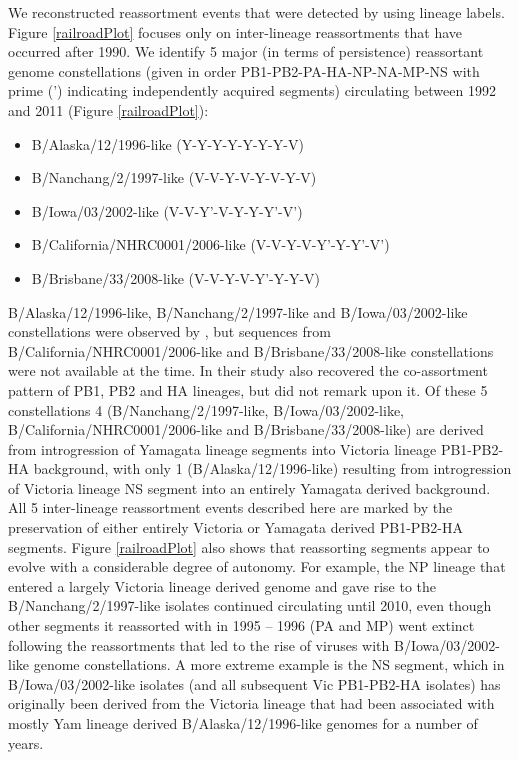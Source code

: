 \documentclass[11pt,oneside,letterpaper]{article}
\begin{document}
We reconstructed reassortment events that were detected by using lineage labels.
Figure \ref{railroadPlot} focuses only on inter-lineage reassortments that have occurred after 1990.
We identify 5 major (in terms of persistence) reassortant genome constellations (given in order PB1-PB2-PA-HA-NP-NA-MP-NS with prime (') indicating independently acquired segments) circulating between 1992 and 2011 (Figure \ref{railroadPlot}):
\begin{itemize}
  \item B/Alaska/12/1996-like (Y-Y-Y-Y-Y-Y-Y-V)
  \item B/Nanchang/2/1997-like (V-V-Y-V-Y-V-Y-V)
  \item B/Iowa/03/2002-like (V-V-Y'-V-Y-Y-Y'-V')
  \item B/California/NHRC0001/2006-like (V-V-Y-V-Y'-Y-Y'-V')
  \item B/Brisbane/33/2008-like (V-V-Y-V-Y'-Y-Y-V)
\end{itemize}
B/Alaska/12/1996-like, B/Nanchang/2/1997-like and B/Iowa/03/2002-like constellations were observed by \citet{chen2008}, but sequences from \\B/California/NHRC0001/2006-like and B/Brisbane/33/2008-like constellations were not available at the time.
In their study \citet{chen2008} also recovered the co-assortment pattern of PB1, PB2 and HA lineages, but did not remark upon it.
Of these 5 constellations 4 (B/Nanchang/2/1997-like, B/Iowa/03/2002-like,\\ B/California/NHRC0001/2006-like and B/Brisbane/33/2008-like) are derived from introgression of Yamagata lineage segments into Victoria lineage PB1-PB2-HA background, with only 1 (B/Alaska/12/1996-like) resulting from introgression of Victoria lineage NS segment into an entirely Yamagata derived background.
All 5 inter-lineage reassortment events described here are marked by the preservation of either entirely Victoria or Yamagata derived PB1-PB2-HA segments.
Figure \ref{railroadPlot} also shows that reassorting segments appear to evolve with a considerable degree of autonomy.
For example, the NP lineage that entered a largely Victoria lineage derived genome and gave rise to the B/Nanchang/2/1997-like isolates continued circulating until 2010, even though other segments it reassorted with in 1995 -- 1996 (PA and MP) went extinct following the reassortments that led to the rise of viruses with B/Iowa/03/2002-like genome constellations.
A more extreme example is the NS segment, which in B/Iowa/03/2002-like isolates (and all subsequent Vic PB1-PB2-HA isolates) has originally been derived from the Victoria lineage that had been associated with mostly Yam lineage derived B/Alaska/12/1996-like genomes for a number of years.
\end{document}
